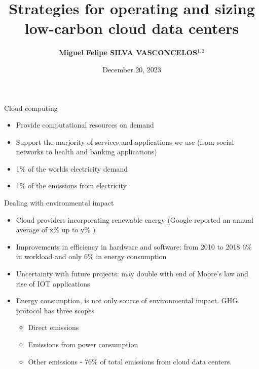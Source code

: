 \documentclass[Ligatures=TeX,table,svgnames,usetotalslideindicator,compress,10pt]{beamer}
\title{Strategies for operating and sizing low-carbon cloud data centers}
\author{\textbf{Miguel Felipe SILVA VASCONCELOS}$^{1,2}$}
\institute
{
  Univ. Grenoble Alpes, Inria, CNRS, Grenoble INP, LIG, Grenoble, France$^{1}$\\
  School of Sciences, Arts, and Humanities, University of São Paulo, Brazil$^{2}$\\
}
\date{December 20, 2023}
\begin{document}
\begin{frame}
  \titlepage
\end{frame}


\begin{frame}{Cloud computing}
  
  \begin{itemize}
   
  \item Provide computational resources on demand 
  \item Support the marjority of services and applications we use  (from social networks to health and banking applications)
  \item 1\% of the worlds electricity demand 
  \item 1\% of the  emissions from electricity
    
  \end{itemize}
  
\end{frame}

\begin{frame}{Dealing with environmental impact}
  
  \begin{itemize}    
  \item Cloud providers incorporating renewable energy (Google reported an annual average of x\% up to y\% )    
  \item Improvements in efficiency in hardware and software:  from 2010 to 2018 6\% in workload and only 6\% in energy consumption
  \item Uncertainty with future projects: may double with end of    Moore's law and rise of IOT applications
  \item Energy consumption, is not only source of environmental impact. GHG protocol has three scopes    
    \begin{itemize}
       \item Direct emissions
       \item Emissions from power consumption
       \item Other emissions - 76\% of total emissions from cloud data centers.
     \end{itemize}       
   \end{itemize}   
\end{frame}
\end{document}
